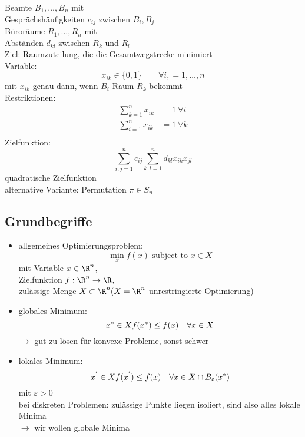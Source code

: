 \begin{beispiel}\enter
	Beamte $B_{1},\dots,B_{n}$ mit \\
	Gesprächshäufigkeiten $c_{ij}$ zwischen $B_{i},B_{j}$ \\
	Büroräume $R_{1}, \dots, R_{n}$ mit \\
	Abständen $d_{kl}$ zwischen $R_{k}$ und $R_{l}$ \\
	Ziel: Raumzuteilung, die die Gesamtwegstrecke minimiert\\
	Variable:
	\begin{equation*}
		x_{ik} \in \{0,1\}\qquad \forall i,=1,\dots,n
	\end{equation*} 
	mit $x_{ik}$ genau dann, wenn $B_{i}$ Raum $R_{k}$ bekommt\\
	Restriktionen: 
	\begin{align*}
		\sum_{k=1}^{n} x_{ik} &=1 \ \forall i\\
		\sum_{i=1}^{n} x_{ik} &=1 \ \forall k\\
	\end{align*} 
	Zielfunktion: 
	\begin{equation*}
		\sum_{i,j=1}^{n} c_{ij}\sum_{k,l=1}^{n} d_{kl}x_{ik}x_{jl}
	\end{equation*} 
	quadratische Zielfunktion \\
	alternative Variante: Permutation $\pi \in S_{n}$
\end{beispiel}

\subsection{Grundbegriffe}
\begin{itemize}
	\item allgemeines Optimierungsproblem: 
		\begin{equation*}
			\min_{x} f(x) \text{ subject to } x\in X
		\end{equation*} 
		mit Variable $x \in \R^n$,\\
		Zielfunktion $f:\R^n \to \R$,\\
		zulässige Menge $X \subset \R^n (X = \R^n$ unrestringierte Optimierung)
	\item globales Minimum: 
		\begin{equation*}
			x^* \in X \mit f(x^*)\leq f(x)\quad \forall x \in X
		\end{equation*} 
		$\to$ gut zu lösen für konvexe Probleme, sonst schwer
	\item lokales Minimum:
		\begin{equation*}
			x^{'} \in X \mit f(x^{'}) \leq f(x)\quad \forall x \in X \cap B_{\varepsilon}(x^*)
		\end{equation*} 
		mit $\varepsilon > 0$\\
		bei diskreten Problemen: zulässige Punkte liegen isoliert, sind also alles lokale Minima\\
		$\to$  wir wollen globale Minima
\end{itemize} 
